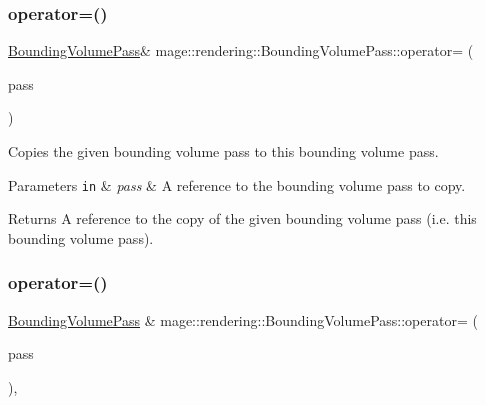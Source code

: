 \subsubsection{\texorpdfstring{operator=()}{operator=()}\hspace{0.1cm}{\footnotesize\ttfamily [1/2]}}
{\footnotesize\ttfamily \mbox{\hyperlink{classmage_1_1rendering_1_1_bounding_volume_pass}{Bounding\+Volume\+Pass}}\& mage\+::rendering\+::\+Bounding\+Volume\+Pass\+::operator= (\begin{DoxyParamCaption}\item[{const \mbox{\hyperlink{classmage_1_1rendering_1_1_bounding_volume_pass}{Bounding\+Volume\+Pass}} \&}]{pass }\end{DoxyParamCaption})\hspace{0.3cm}{\ttfamily [delete]}}

Copies the given bounding volume pass to this bounding volume pass.


\begin{DoxyParams}[1]{Parameters}
\mbox{\tt in}  & {\em pass} & A reference to the bounding volume pass to copy. \\
\hline
\end{DoxyParams}
\begin{DoxyReturn}{Returns}
A reference to the copy of the given bounding volume pass (i.\+e. this bounding volume pass). 
\end{DoxyReturn}
\mbox{\label{classmage_1_1rendering_1_1_bounding_volume_pass_a39c5dffd1a1381672e3dbc14eb07c8cf}} 
\subsubsection{\texorpdfstring{operator=()}{operator=()}\hspace{0.1cm}{\footnotesize\ttfamily [2/2]}}
{\footnotesize\ttfamily \mbox{\hyperlink{classmage_1_1rendering_1_1_bounding_volume_pass}{Bounding\+Volume\+Pass}} \& mage\+::rendering\+::\+Bounding\+Volume\+Pass\+::operator= (\begin{DoxyParamCaption}\item[{\mbox{\hyperlink{classmage_1_1rendering_1_1_bounding_volume_pass}{Bounding\+Volume\+Pass}} \&\&}]{pass }\end{DoxyParamCaption})\hspace{0.3cm}{\ttfamily [default]}, {\ttfamily [noexcept]}}

